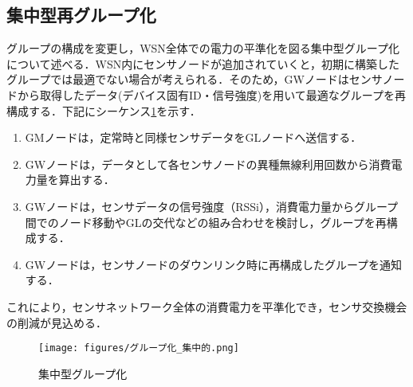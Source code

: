 \subsection{集中型再グループ化}
グループの構成を変更し，WSN全体での電力の平準化を図る集中型グループ化について述べる．WSN内にセンサノードが追加されていくと，初期に構築したグループでは最適でない場合が考えられる．そのため，GWノードはセンサノードから取得したデータ(デバイス固有ID・信号強度)を用いて最適なグループを再構成する．下記にシーケンス\ref{fig:group_reconstruction_concentrately}を示す．

\begin{enumerate}
    \item GMノードは，定常時と同様センサデータをGLノードへ送信する．
    \item GWノードは，データとして各センサノードの異種無線利用回数から消費電力量を算出する．
    \item GWノードは，センサデータの信号強度（RSSi），消費電力量からグループ間でのノード移動やGLの交代などの組み合わせを検討し，グループを再構成する．
    \item GWノードは，センサノードのダウンリンク時に再構成したグループを通知する．
\end{enumerate}

これにより，センサネットワーク全体の消費電力を平準化でき，センサ交換機会の削減が見込める．

\begin{figure}[]
    \begin{center}
    \texttt{[image: figures/グループ化\_集中的.png]}
    \caption{集中型グループ化}
    \label{fig:group_reconstruction_concentrately}
    \end{center}
\end{figure}